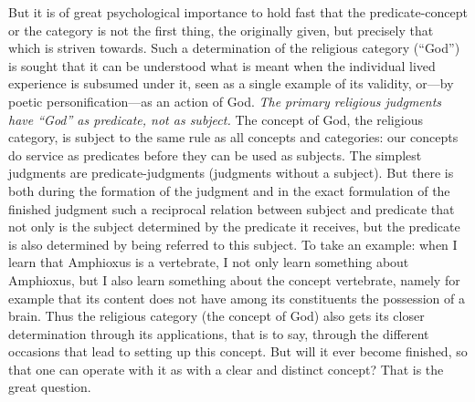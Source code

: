 \documentclass[12pt,a4paper]{book}
\newcommand{\opage}[1]{\marginnote{\footnotesize\textit{[#1]}}}
\begin{document}
But it is of great psychological importance to hold fast that the predicate-concept or the
category is not the first thing, the originally given, but precisely that which is striven
towards. Such a determination of the religious category (``God'') is sought that it can be
understood what is meant when the individual lived experience is subsumed under it, seen as a
single example of its validity, or---by poetic personification---as an action of God.
\emph{The primary religious judgments have ``God'' as predicate, not as subject.} The concept
of God, the religious category, is subject to the same rule as all concepts and categories:
our concepts do service as predicates before they can be used as subjects. The simplest
judgments are predicate-judgments (judgments without a subject). But there is both during the
formation of the judgment and in the exact formulation of the finished judgment such a
reciprocal relation between subject and predicate that not only is the subject determined by
the predicate it receives, but the predicate is also determined by being referred to this
subject. To take an example: when I learn that Amphioxus is a vertebrate, I not only learn
something about Amphioxus, but I also learn something about the concept vertebrate, namely for
example that its content does not have among its constituents the possession of a brain. Thus
the religious category (the concept of God) also gets its closer determination through its
applications, that is to say, through the different occasions that lead to setting up this
concept. 
\opage{125}But will it ever become finished, so that one can operate with it as with a clear and
distinct concept? That is the great question.
\end{document}

